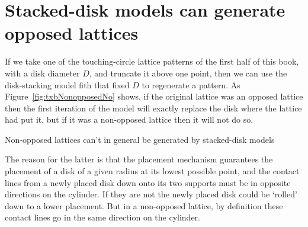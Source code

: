 \section{Stacked-disk models can generate opposed lattices}
If we take one of the touching-circle lattice patterns of the first half of this book, with a disk diameter $D$, and truncate it above one point, then
we can use the disk-stacking model fith that fixed $D$ to regenerate a pattern. As Figure~\ref{fig:txbNonopposedNo} shows, if the original lattice was an opposed lattice then the first iteration of the model will exactly replace the disk where the lattice had put it, but if it was a non-opposed lattice then it will not do so.
\begin{marginfigure}
	\centering
	\caption{Non-opposed lattices can't in general be generated by stacked-disk models}\label{fig:txbNonopposedNo}
\end{marginfigure}
The reason for the latter is that the placement mechanism guarantees the placement of a disk of a given radius at its lowest possible point, and the contact lines from a newly placed disk down onto its two supports must be in opposite directions on the cylinder. If they are not the newly placed disk could be `rolled' down to a lower placement. But in a non-opposed lattice, by definition these contact lines go in the same direction on the cylinder.
\clearpage

